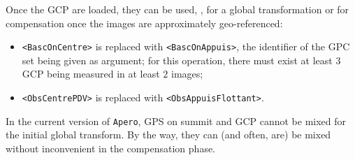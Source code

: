 Once the GCP are loaded, they can be used, , for a global transformation
or  for compensation once the images are approximately geo-referenced:

\begin{itemize}
   \item {\tt  <BascOnCentre>} is replaced with {\tt <BascOnAppuis>}, the identifier of
          the GPC set being given as argument; for this operation, there must exist at least
          $3$ GCP being measured in at least $2$ images;


   \item {\tt <ObsCentrePDV>} is replaced with {\tt  <ObsAppuisFlottant>}.
\end{itemize}


In the current version of {\tt Apero}, GPS on summit and GCP cannot be mixed for the
initial global transform. By the way, they can (and often, are) be mixed without
inconvenient in the compensation phase.









